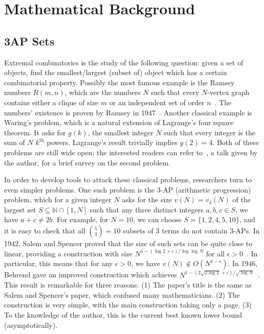 \section{Mathematical Background}

\subsection{3AP Sets}

Extremal combinatorics is the study of the following question: given a set of objects, find the smallest/largest (subset of) object which has a certain combinatorial property. Possibly the most famous example is the Ramsey numbers \(R(m, n)\), which are the numbers \(N\) such that every \(N\)-vertex graph contains either a clique of size \(m\) or an independent set of order \(n\)~\cite{SamJacques2024}. The numbers' existence is proven by Ramsey in 1947~\cite{Erdös47}. Another classical example is Waring's problem, which is a natural extension of Lagrange's four square theorem. It asks for \(g(k)\), the smallest integer \(N\) such that every integer is the sum of \(N\) \(k^\text{th}\) powers. Lagrange's result trivially implies \(g(2) = 4\). Both of these problems are still wide open; the interested readers can refer to~\cite{Ma2024}, a talk given by the author, for a brief survey on the second problem.

In order to develop tools to attack these classical problems, researchers turn to even simpler problems. One such problem is the \(3\)-AP (arithmetic progression) problem, which for a given integer \(N\) asks for the size \(v(N) = v_3(N)\) of the largest set \(S \subseteq \mathbb{N} \cap [1, N]\) such that any three distinct integers \(a, b, c \in S\), we have \(a + c \neq 2b\). For example, for \(N = 10\), we can choose \(S = \{1, 2, 4, 5, 10\}\), and it is easy to check that all \(\binom{5}{3} = 10\) subsets of \(3\) terms do not contain \(3\)-APs. In 1942, Salem and Spencer proved that the size of such sets can be quite close to linear, providing a construction with size \(N^{1 - (\log 2 + \varepsilon) / \log \log N}\) for all \(\epsilon > 0\)~\cite{SalemSpencer1942}. In particular, this means that for any \(\epsilon > 0\), we have \(v(N) \not \in O(N^{1 - \epsilon})\). In 1946, Behrend gave an improved construction which achieves \(N^{1 - (2\sqrt{2 \log 2} + \varepsilon) / \sqrt{\log N}}\)~\cite{Behrend1946}. This result is remarkable for three reasons: (1) The paper's title is the same as Salem and Spencer's paper, which confused many mathematicians. (2) The construction is very simple, with the main construction taking only a page. (3) To the knowledge of the author, this is the current best known lower bound (asymptotically).

